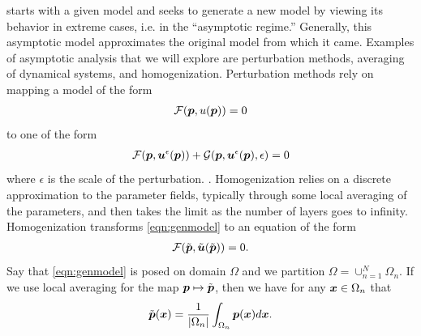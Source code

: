  starts with a given model and seeks to generate a new model by viewing its behavior in extreme cases, i.e. in the ``asymptotic regime.'' Generally, this asymptotic model approximates the original model from which it came. Examples of asymptotic analysis that we will explore are perturbation methods, averaging of dynamical systems, and homogenization. Perturbation methods rely on mapping a model of the form
\begin{align} \label{eqn:genmodel}
    \mathcal{F}(\boldsymbol{p}, u(\boldsymbol{p})) = 0
\end{align}
to one of the form
\begin{align} \label{eqn:modelperturb}
    \mathcal{F}(\boldsymbol{p}, \boldsymbol{u}^{\epsilon}(\boldsymbol{p})) + \mathcal{G}(\boldsymbol{p}, \boldsymbol{u}^{\epsilon}(\boldsymbol{p}), \epsilon) = 0
\end{align}
where $\epsilon$ is the scale of the perturbation. . Homogenization relies on a discrete approximation to the parameter fields, typically through some local averaging of the parameters, and then takes the limit as the number of layers goes to infinity. Homogenization transforms \eqref{eqn:genmodel} to an equation of the form
\begin{align} \label{eqn:homogen}
\mathcal{F}(\tilde{\boldsymbol{p}}, \tilde{\boldsymbol{u}}(\tilde{\boldsymbol{p}})) = 0.
\end{align}
Say that \eqref{eqn:genmodel} is posed on domain $\Omega$ and we partition $\Omega = \cup_{n=1}^{N} \Omega_{n}$. If we use local averaging for the map $\boldsymbol{p} \mapsto \tilde{\boldsymbol{p}}$, then we have for any $\boldsymbol{x} \in \Omega_{n}$ that
\begin{align} \label{eqn:homogenmap}
\tilde{\boldsymbol{p}}(\boldsymbol{x}) = \frac{1}{|\Omega_n|} \int_{\Omega_n} \boldsymbol{p}(\boldsymbol{x}) d\boldsymbol{x}.
\end{align}


